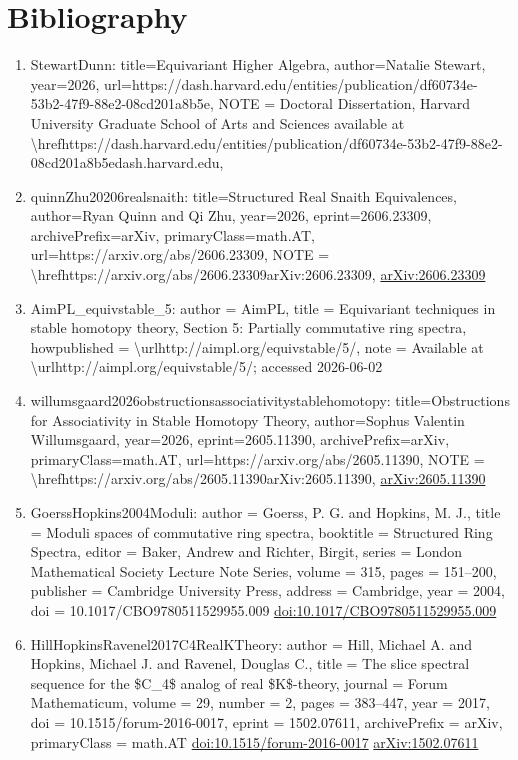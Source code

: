 \documentclass[11pt]{article}
\begin{document}
\section*{Bibliography}
\begin{enumerate}[leftmargin=*]
  \item StewartDunn: title=Equivariant Higher Algebra, author=Natalie Stewart, year=2026, url=https://dash.harvard.edu/entities/publication/df60734e-53b2-47f9-88e2-08cd201a8b5e, NOTE = Doctoral Dissertation, Harvard University Graduate School of Arts and Sciences available at \textbackslash{}hrefhttps://dash.harvard.edu/entities/publication/df60734e-53b2-47f9-88e2-08cd201a8b5edash.harvard.edu,
  \item quinnZhu20206realsnaith: title=Structured Real Snaith Equivalences, author=Ryan Quinn and Qi Zhu, year=2026, eprint=2606.23309, archivePrefix=arXiv, primaryClass=math.AT, url=https://arxiv.org/abs/2606.23309, NOTE = \textbackslash{}hrefhttps://arxiv.org/abs/2606.23309arXiv:2606.23309, \href{https://arxiv.org/abs/2606.23309}{arXiv:2606.23309}
  \item AimPL\_equivstable\_5: author = AimPL, title = Equivariant techniques in stable homotopy theory, Section 5: Partially commutative ring spectra, howpublished = \textbackslash{}urlhttp://aimpl.org/equivstable/5/, note = Available at \textbackslash{}urlhttp://aimpl.org/equivstable/5/; accessed 2026-06-02
  \item willumsgaard2026obstructionsassociativitystablehomotopy: title=Obstructions for Associativity in Stable Homotopy Theory, author=Sophus Valentin Willumsgaard, year=2026, eprint=2605.11390, archivePrefix=arXiv, primaryClass=math.AT, url=https://arxiv.org/abs/2605.11390, NOTE = \textbackslash{}hrefhttps://arxiv.org/abs/2605.11390arXiv:2605.11390, \href{https://arxiv.org/abs/2605.11390}{arXiv:2605.11390}
  \item GoerssHopkins2004Moduli: author = Goerss, P. G. and Hopkins, M. J., title = Moduli spaces of commutative ring spectra, booktitle = Structured Ring Spectra, editor = Baker, Andrew and Richter, Birgit, series = London Mathematical Society Lecture Note Series, volume = 315, pages = 151--200, publisher = Cambridge University Press, address = Cambridge, year = 2004, doi = 10.1017/CBO9780511529955.009 \href{https://doi.org/10.1017/CBO9780511529955.009}{doi:10.1017/CBO9780511529955.009}
  \item HillHopkinsRavenel2017C4RealKTheory: author = Hill, Michael A. and Hopkins, Michael J. and Ravenel, Douglas C., title = The slice spectral sequence for the \$C\_4\$ analog of real \$K\$-theory, journal = Forum Mathematicum, volume = 29, number = 2, pages = 383--447, year = 2017, doi = 10.1515/forum-2016-0017, eprint = 1502.07611, archivePrefix = arXiv, primaryClass = math.AT \href{https://doi.org/10.1515/forum-2016-0017}{doi:10.1515/forum-2016-0017} \href{https://arxiv.org/abs/1502.07611}{arXiv:1502.07611}

\end{enumerate}
\end{document}
